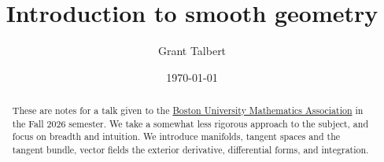 \documentclass{article}
\title{Introduction to smooth geometry}
\author{Grant Talbert}
\date{\today}
\begin{document}
\maketitle
\begin{abstract}
	These are notes for a talk given to the \href{https://bu-ma.github.io/}{Boston University Mathematics Association} in the Fall 2026 semester. We take a somewhat less rigorous approach to the subject, and focus on breadth and intuition. We introduce manifolds, tangent spaces and the tangent bundle, vector fields the exterior derivative, differential forms, and integration.
\end{abstract}

\tableofcontents





\end{document}

